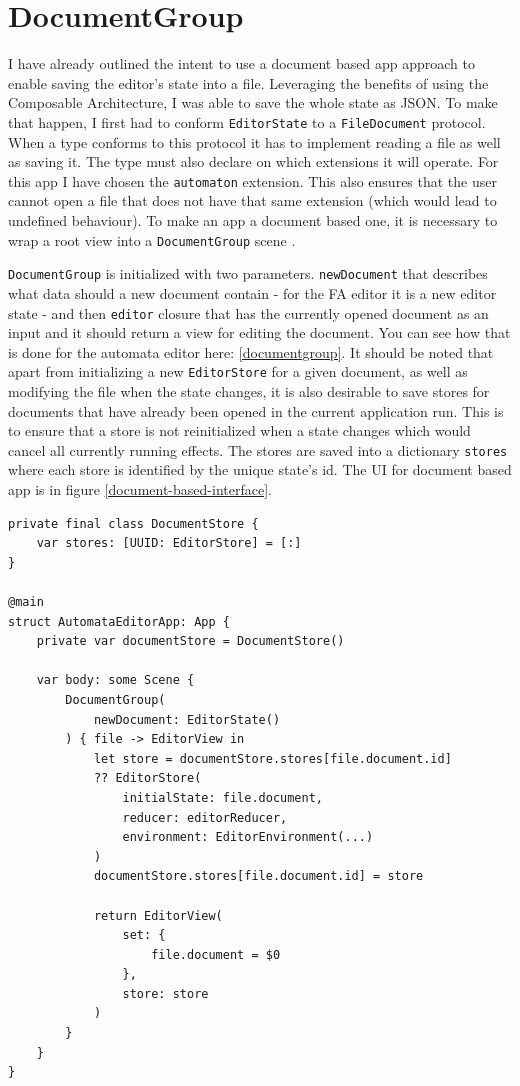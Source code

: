\section{DocumentGroup}

I have already outlined the intent to use a document based app approach to enable saving the editor's state into a file. Leveraging the benefits of using the Composable Architecture, I was able to save the whole state as JSON. To make that happen, I first had to conform \lstinline{EditorState} to a \lstinline{FileDocument} protocol. When a type conforms to this protocol it has to implement reading a file as well as saving it. The type must also declare on which extensions it will operate. For this app I have chosen the \lstinline{automaton} extension. This also ensures that the user cannot open a file that does not have that same extension (which would lead to undefined behaviour). To make an app a document based one, it is necessary to wrap a root view into a \lstinline{DocumentGroup} scene \cite{documentgroup}. 

\lstinline{DocumentGroup} is initialized with two parameters. \lstinline{newDocument} that describes what data should a new document contain - for the FA editor it is a new editor state - and then \lstinline{editor} closure that has the currently opened document as an input and it should return a view for editing the document. You can see how that is done for the automata editor here: \ref{documentgroup}. It should be noted that apart from initializing a new \lstinline{EditorStore} for a given document, as well as modifying the file when the state changes, it is also desirable to save stores for documents that have already been opened in the current application run. This is to ensure that a store is not reinitialized when a state changes which would cancel all currently running effects. The stores are saved into a dictionary \lstinline{stores} where each store is identified by the unique state's id. The UI for document based app is in figure \ref{document-based-interface}.

\begin{lstlisting}[caption={DocumentGroup scene}, label=documentgroup]
private final class DocumentStore {
    var stores: [UUID: EditorStore] = [:]
}

@main
struct AutomataEditorApp: App {
    private var documentStore = DocumentStore()
    
    var body: some Scene {
        DocumentGroup(
            newDocument: EditorState()
        ) { file -> EditorView in
            let store = documentStore.stores[file.document.id] 
            ?? EditorStore(
                initialState: file.document,
                reducer: editorReducer,
                environment: EditorEnvironment(...)
            )
            documentStore.stores[file.document.id] = store
            
            return EditorView(
                set: {
                    file.document = $0
                },
                store: store
            )
        }
    }
}
\end{lstlisting}

